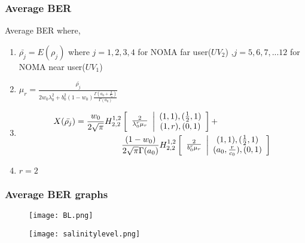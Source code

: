 \documentclass{beamer}
\providecommand{\sbrak}[1]{\ensuremath{{}\left[#1\right]}}
\begin{document}
\begin{frame}
\frametitle{Average BER}
\begin{block}{Average BER}
where,
\begin{enumerate}
\item $\bar{\rho_j} = E(\rho_j)$ where $j=1,2,3,4$ for NOMA far user($UV_2$) ,$j=5,6,7,...12$ for NOMA near user($UV_1$)  
\item $\mu_r=\frac{\bar{\rho_j}}{2w_0 \lambda_0^2 +b_0^2(1-w_0) \frac{\Gamma(a_0+\frac{2}{c_0})}{\Gamma(a_0)}}$
\item \begin{align}
X(\bar{\rho_j}) = \frac{w_0}{2 \sqrt{\pi}}H^{1,2}_{2,2} & \sbrak{\begin{array}{c}
\frac{2}{\lambda_0^r \mu_r}
\end{array} \middle \vert
\begin{array}{c}
(1,1),(\frac{1}{2},1) \\
(1,r),(0,1) 
\end{array} }  + \notag \\ 
& \frac{(1-w_0)}{2 \sqrt{\pi} \Gamma(a_0)} H^{1,2}_{2,2} \sbrak{\begin{array}{c}
\frac{2}{b_0^r \mu_r}
\end{array} \middle \vert
\begin{array}{c}
(1,1),(\frac{1}{2},1) \\
(a_0,\frac{r}{c_0}),(0,1) 
\end{array} } 
\end{align}
\item $r=2$ 
\end{enumerate}
\end{block}
\end{frame}


\begin{frame}
\frametitle{Average BER graphs}
\begin{figure}[htb!]
\begin{center}
\texttt{[image: BL.png]}
\end{center}
\end{figure}

\begin{figure}[htb!]
\begin{center}
\texttt{[image: salinitylevel.png]}
\end{center}
\end{figure}
\end{frame}
\end{document}
